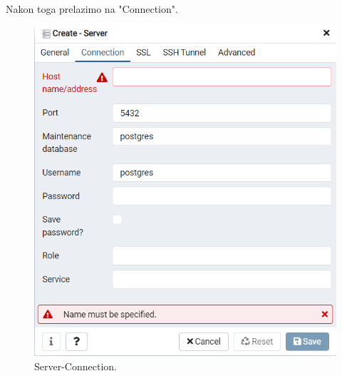 			 Nakon toga prelazimo na "Connection". 
			 
			 \begin{figure}[H]
			 	\includegraphics[scale=1]{slike/server connection.png} 
			 	\centering
			 	\caption{ Server-Connection.}
			 	\label{SC}
			 \end{figure}
			 
